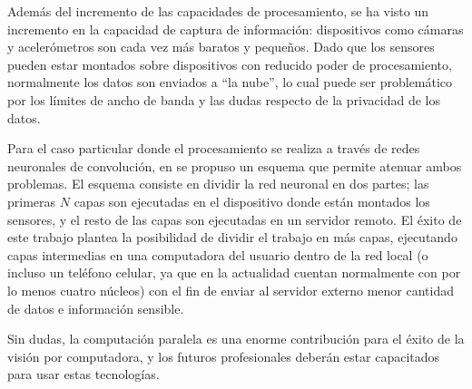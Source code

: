 Además del incremento de las capacidades de procesamiento, se ha visto un
incremento en la capacidad de captura de información: dispositivos como cámaras
y acelerómetros son cada vez más baratos y pequeños. Dado que los sensores
pueden estar montados sobre dispositivos con reducido poder de procesamiento,
normalmente los datos son enviados a ``la nube'', lo cual puede ser problemático
por los límites de ancho de banda y las dudas respecto de la privacidad de los
datos.

Para el caso particular donde el procesamiento se realiza a través de redes
neuronales de convolución, en \cite{pipelinebasedCaffe2017} se propuso un
esquema que permite atenuar ambos problemas. El esquema consiste en dividir la
red neuronal en dos partes; las primeras $N$ capas son ejecutadas en el
dispositivo donde están montados los sensores, y el resto de las capas son
ejecutadas en un servidor remoto. El éxito de este trabajo plantea la
posibilidad de dividir el trabajo en más capas, ejecutando capas intermedias en
una computadora del usuario dentro de la red local (o incluso un teléfono
celular, ya que en la actualidad cuentan normalmente con por lo menos cuatro
núcleos) con el fin de enviar al servidor externo menor cantidad de datos e
información sensible.

Sin dudas, la computación paralela es una enorme contribución para el éxito de
la visión por computadora, y los futuros profesionales deberán estar capacitados
para usar estas tecnologías.
